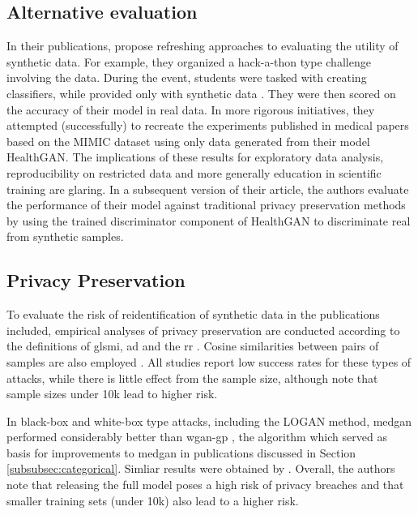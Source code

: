     \subsection{Alternative evaluation}
    In their publications, \citeauthor{Yale_2020} propose refreshing approaches to evaluating the utility of synthetic data. For example, they organized a hack-a-thon type challenge involving the data. During the event, students were tasked with creating classifiers, while provided only with synthetic data \cite{Yale_2020}. They were then scored on the accuracy of their model in real data. In more rigorous initiatives, they attempted (successfully) to recreate the experiments published in medical papers based on the MIMIC dataset using only data generated from their model HealthGAN. The implications of these results for exploratory data analysis, reproducibility on restricted data and more generally education in scientific training are glaring. In a subsequent version of their article, the authors evaluate the performance of their model against traditional privacy preservation methods by using the trained discriminator component of HealthGAN to discriminate real from synthetic samples.
        
    \subsection{Privacy Preservation}
    To evaluate the risk of reidentification of synthetic data in the publications included, empirical analyses of privacy preservation are conducted according to the definitions of gls{mi}, \gls{ad}  \cite{Choi2017-nt,Goncalves2020,yan2020generating,chen2019ganleaks} and the \gls{rr} \cite{Zhang2020}. Cosine similarities between pairs of samples are also employed \cite{torfi2019generating}. All studies report low success rates for these types of attacks, while there is little effect from the sample size, although \citeauthor{chen2019ganleaks} note that sample sizes under 10k lead to higher risk. \par
    
    In black-box and white-box type attacks, including the LOGAN \cite{hayes2017logan} method, \gls{medgan} performed considerably better than \gls{wgan-gp} \cite{gulrajani2017improved}, the algorithm which served as basis for improvements to \gls{medgan} in publications discussed in Section \ref{subsubsec:categorical}. Simliar results were obtained by \citeauthor{chen2019ganleaks}. Overall, the authors note that releasing the full model poses a high risk of privacy breaches and that smaller training sets (under 10k) also lead to a higher risk.\par
    
